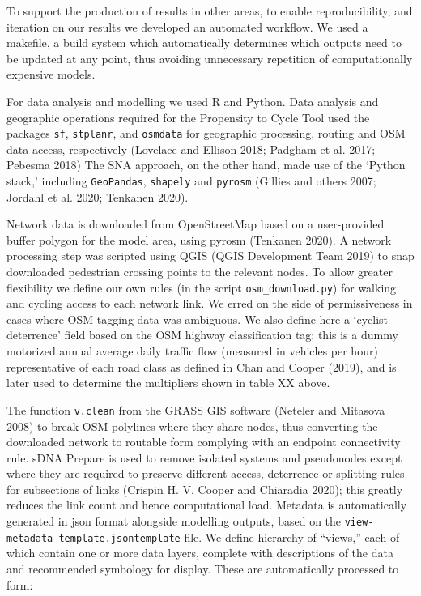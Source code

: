 \documentclass[galley]{jtlu-article-2col}
\begin{document}
To support the production of results in other areas, to enable reproducibility, and iteration on our results we developed an automated workflow.
We used a makefile, a build system which automatically determines which outputs need to be updated at any point, thus avoiding unnecessary repetition of computationally expensive models.

For data analysis and modelling we used R and Python.
Data analysis and geographic operations required for the Propensity to Cycle Tool used the packages \texttt{sf}, \texttt{stplanr}, and \texttt{osmdata} for geographic processing, routing and OSM data access, respectively (Lovelace and Ellison 2018; Padgham et al. 2017; Pebesma 2018)
The SNA approach, on the other hand, made use of the `Python stack,' including \texttt{GeoPandas}, \texttt{shapely} and \texttt{pyrosm} (Gillies and others 2007; Jordahl et al. 2020; Tenkanen 2020).

Network data is downloaded from OpenStreetMap based on a user-provided buffer polygon for the model area, using pyrosm (Tenkanen 2020).
A network processing step was scripted using QGIS (QGIS Development Team 2019) to snap downloaded pedestrian crossing points to the relevant nodes.
To allow greater flexibility we define our own rules (in the script \texttt{osm\_download.py}) for walking and cycling access to each network link.
We erred on the side of permissiveness in cases where OSM tagging data was ambiguous.
We also define here a `cyclist deterrence' field based on the OSM highway classification tag; this is a dummy motorized annual average daily traffic flow (measured in vehicles per hour) representative of each road class as defined in Chan and Cooper (2019), and is later used to determine the multipliers shown in table XX above.

The function \texttt{v.clean} from the GRASS GIS software (Neteler and Mitasova 2008) to break OSM polylines where they share nodes, thus converting the downloaded network to routable form complying with an endpoint connectivity rule.
sDNA Prepare is used to remove isolated systems and pseudonodes except where they are required to preserve different access, deterrence or splitting rules for subsections of links (Crispin H. V. Cooper and Chiaradia 2020); this greatly reduces the link count and hence computational load.
Metadata is automatically generated in json format alongside modelling outputs, based on the \texttt{view-metadata-template.jsontemplate} file.
We define hierarchy of ``views,'' each of which contain one or more data layers, complete with descriptions of the data and recommended symbology for display.
These are automatically processed to form:
\end{document}
